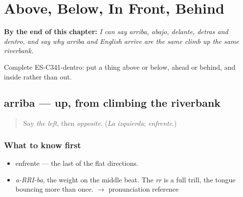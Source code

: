 
\chapter{Above, Below, In Front, Behind}
\label{ch:arriba-y-abajo}

\begin{chapteropening}
\textbf{By the end of this chapter:} \emph{I can say arriba, abajo, delante, detras and dentro, and say why arriba and English arrive are the same climb up the same riverbank.}

Complete ES-C341-dentro: put a thing above or below, ahead or behind, and inside rather than out.
\end{chapteropening}

\section[arriba]{arriba — up, from climbing the riverbank}

\label{lesson:ES-C341-arriba}



\begin{quote}
Say \emph{the left}, then \emph{opposite}. (\emph{La izquierda}; \emph{enfrente}.)
\end{quote}

\subsection*{What to know first}
\begin{itemize}
\raggedright
  \item enfrente — the last of the flat directions.
\end{itemize}

\begin{sounds}
\begin{itemize}
\raggedright
  \item \emph{a-RRI-ba}, the weight on the middle beat. The \emph{rr} is a full trill, the tongue bouncing more than once. $\to$ pronunciation reference
\end{itemize}
\end{sounds}

